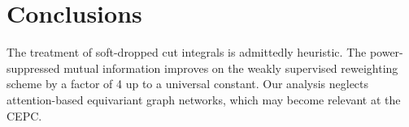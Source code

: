 \section{Conclusions}\label{sec:conclusions}

The treatment of soft-dropped cut integrals is admittedly heuristic. The
power-suppressed mutual information improves on the weakly supervised
reweighting scheme by a factor of 4 up to a universal constant. Our
analysis neglects attention-based equivariant graph networks, which may
become relevant at the CEPC.

